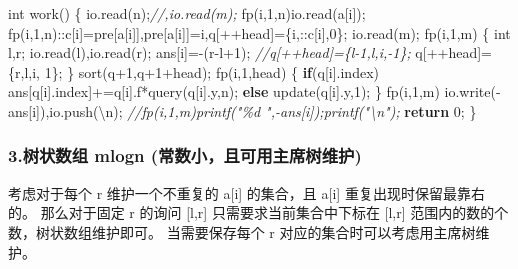 \documentclass[
]{article}
\newenvironment{Shaded}{}{}
\newcommand{\CharTok}[1]{\textcolor[rgb]{0.25,0.44,0.63}{#1}}
\newcommand{\CommentTok}[1]{\textcolor[rgb]{0.38,0.63,0.69}{\textit{#1}}}
\newcommand{\ControlFlowTok}[1]{\textcolor[rgb]{0.00,0.44,0.13}{\textbf{#1}}}
\newcommand{\DataTypeTok}[1]{\textcolor[rgb]{0.56,0.13,0.00}{#1}}
\newcommand{\DecValTok}[1]{\textcolor[rgb]{0.25,0.63,0.44}{#1}}
\newcommand{\NormalTok}[1]{#1}
\newcommand{\SpecialCharTok}[1]{\textcolor[rgb]{0.25,0.44,0.63}{#1}}
\begin{document}
\begin{Shaded}
\begin{Highlighting}[]
\DataTypeTok{int}\NormalTok{ work()}
\NormalTok{\{}
\NormalTok{    io.read(n);}\CommentTok{//,io.read(m);}
\NormalTok{    fp(i,}\DecValTok{1}\NormalTok{,n)io.read(a[i]);}
\NormalTok{    fp(i,}\DecValTok{1}\NormalTok{,n)::c[i]=pre[a[i]],pre[a[i]]=i,q[++head]=\{i,::c[i],}\DecValTok{0}\NormalTok{\};}
\NormalTok{    io.read(m);}
\NormalTok{    fp(i,}\DecValTok{1}\NormalTok{,m)}
\NormalTok{    \{}
        \DataTypeTok{int}\NormalTok{ l,r; io.read(l),io.read(r);}
\NormalTok{        ans[i]={-}(r{-}l+}\DecValTok{1}\NormalTok{);}
        \CommentTok{//q[++head]=\{l{-}1,l,i,{-}1\};}
\NormalTok{        q[++head]=\{r,l,i, }\DecValTok{1}\NormalTok{\};}
\NormalTok{    \}}
\NormalTok{    sort(q+}\DecValTok{1}\NormalTok{,q+}\DecValTok{1}\NormalTok{+head);}
\NormalTok{    fp(i,}\DecValTok{1}\NormalTok{,head)}
\NormalTok{    \{}
        \ControlFlowTok{if}\NormalTok{(q[i].index) ans[q[i].index]+=q[i].f*query(q[i].y,n);}
        \ControlFlowTok{else}\NormalTok{ update(q[i].y,}\DecValTok{1}\NormalTok{);}
\NormalTok{    \}}
\NormalTok{    fp(i,}\DecValTok{1}\NormalTok{,m) io.write({-}ans[i]),io.push(}\CharTok{\textquotesingle{}}\SpecialCharTok{\textbackslash{}n}\CharTok{\textquotesingle{}}\NormalTok{);}
    \CommentTok{//fp(i,1,m)printf("\%d ",{-}ans[i]);printf("\textbackslash{}n");}
    \ControlFlowTok{return} \DecValTok{0}\NormalTok{;}
\NormalTok{\}}
\end{Highlighting}
\end{Shaded}

\hypertarget{ux6811ux72b6ux6570ux7ec4-mlogn-ux5e38ux6570ux5c0fux4e14ux53efux7528ux4e3bux5e2dux6811ux7ef4ux62a4}{%
\subsubsection{3.树状数组 mlogn
(常数小，且可用主席树维护)}\label{ux6811ux72b6ux6570ux7ec4-mlogn-ux5e38ux6570ux5c0fux4e14ux53efux7528ux4e3bux5e2dux6811ux7ef4ux62a4}}

考虑对于每个 r 维护一个不重复的 a{[}i{]} 的集合，且 a{[}i{]}
重复出现时保留最靠右的。 那么对于固定 r 的询问 {[}l,r{]}
只需要求当前集合中下标在 {[}l,r{]} 范围内的数的个数，树状数组维护即可。
当需要保存每个 r 对应的集合时可以考虑用主席树维护。
\end{document}

